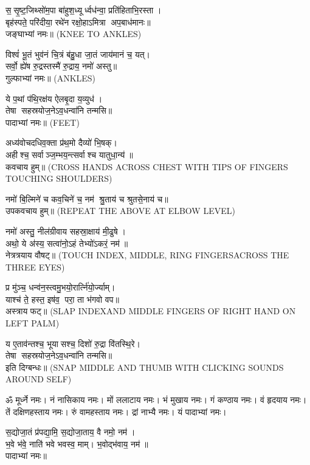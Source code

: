 स॒सृ॒ष्ट॒जिथ्सो॑म॒पा बा॑हुश॒ध्यूर्ध्वध॑न्वा॒ प्रति॑हिताभि॒रस्ता।\\
बृह॑स्पते॒ परि॑दीया॒ रथे॑न रक्षो॒हाऽमित्रा अप॒बाध॑मानः॥\\
जङ्घाभ्यां नमः॥ {\scriptsize (KNEE TO ANKLES)}

विश्वं॑ भू॒तं भुव॑नं चि॒त्रं ब॑हु॒धा जा॒तं जाय॑मानं च॒ यत्।\\
सर्वो॒ ह्ये॑ष रु॒द्रस्तस्मै॑ रु॒द्राय॒ नमो॑ अस्तु॥\\
गुल्फाभ्यां नमः॥ {\scriptsize (ANKLES)}

ये प॒थां प॑थि॒रक्ष॑य ऐलबृ॒दा य॒व्युध॑।\\
तेषा सहस्रयोज॒नेऽव॒धन्वा॑नि तन्मसि॥ \\
पादाभ्यां नमः॥ {\scriptsize (FEET)}


अध्य॑वोचदधिव॒क्ता प्र॑थ॒मो दैव्यो॑ भि॒षक्।\\
अहीश्च॒ सर्वाञ्ज॒म्भय॒न्त्सर्वाश्च यातुधा॒न्य॑॥\\
कवचाय हुम्॥ {\scriptsize (CROSS HANDS ACROSS CHEST WITH TIPS OF FINGERS TOUCHING SHOULDERS)}


नमो॑ बि॒ल्मिने॑ च कव॒चिने॑ च॒ नम॑ श्रु॒ताय॑ च श्रुतसे॒नाय॑ च॥\\
उपकवचाय हुम्॥ {\scriptsize (REPEAT THE ABOVE AT ELBOW LEVEL)}

नमो॑ अस्तु॒ नील॑ग्रीवाय सहस्रा॒क्षाय॑ मी॒ढुषे। \\
अथो॒ ये अ॑स्य॒ सत्वा॑नो॒ऽहं तेभ्यो॑ऽकरं॒ नम॑॥ \\
नेत्रत्रयाय वौषट्॥ {\scriptsize (TOUCH INDEX, MIDDLE, RING FINGERSACROSS THE THREE EYES)}


प्र मु॑ञ्च॒ धन्व॑न॒स्त्वमु॒भयो॒रार्त्नि॑यो॒र्ज्याम्।\\
याश्च॑ ते॒ हस्त॒ इष॑व॒ परा॒ ता भ॑गवो वप॥\\ 
अस्त्राय फट्॥ {\scriptsize (SLAP INDEXAND MIDDLE FINGERS OF RIGHT HAND ON LEFT PALM)}

य ए॒ताव॑न्तश्च॒ भूयासश्च॒ दिशो॑ रु॒द्रा वि॑तस्थि॒रे।\\
 तेषा सहस्रयोज॒नेऽव॒धन्वा॑नि तन्मसि॥ \\
इति दिग्बन्धः॥ {\scriptsize (SNAP MIDDLE AND THUMB WITH CLICKING SOUNDS AROUND SELF)}

{\small \closesection}

ॐ मूर्ध्ने नमः। नं नासिकाय नमः। मों ललाटाय नमः। भं मुखाय नमः। गं कण्ठाय नमः। वं हृदयाय नमः। तें दक्षिणहस्ताय नमः। रुं वामहस्ताय नमः। द्रां नाभ्यै नमः। यं पादाभ्यां नमः।

स॒द्योजा॒तं प्र॑पद्या॒मि॒ स॒द्योजा॒ताय॒ वै नमो॒ नम॑।\\
भ॒वे भ॑वे॒ नाति॑ भवे भवस्व॒ माम्। भ॒वोद्भ॑वाय॒ नम॑॥ \\
पादाभ्यां नमः॥

